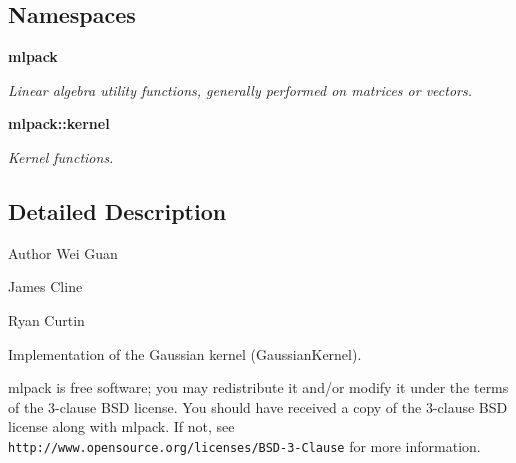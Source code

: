 \subsection*{Namespaces}
\begin{DoxyCompactItemize}
\item 
 \textbf{ mlpack}
\begin{DoxyCompactList}\small\item\em Linear algebra utility functions, generally performed on matrices or vectors. \end{DoxyCompactList}\item 
 \textbf{ mlpack\+::kernel}
\begin{DoxyCompactList}\small\item\em Kernel functions. \end{DoxyCompactList}\end{DoxyCompactItemize}


\subsection{Detailed Description}
\begin{DoxyAuthor}{Author}
Wei Guan 

James Cline 

Ryan Curtin
\end{DoxyAuthor}
Implementation of the Gaussian kernel (Gaussian\+Kernel).

mlpack is free software; you may redistribute it and/or modify it under the terms of the 3-\/clause B\+SD license. You should have received a copy of the 3-\/clause B\+SD license along with mlpack. If not, see {\tt http\+://www.\+opensource.\+org/licenses/\+B\+S\+D-\/3-\/\+Clause} for more information. 